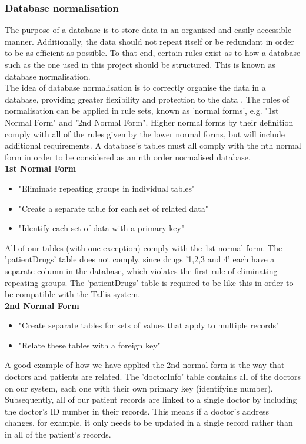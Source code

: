 \documentclass[11pt]{article}
\begin{document}
\subsubsection{Database normalisation}
The purpose of a database is to store data in an organised and easily accessible manner.  Additionally, the data should not repeat itself or be redundant in order to be as efficient as possible. To that end, certain rules exist as to how a database such as the one used in this project should be structured. This is known as database normalisation.
\\ \indent
The idea of database normalisation is to correctly organise the data in a database, providing greater flexibility and protection to the data \cite{microsoft:dbnorm}. The rules of normalisation can be applied in rule sets, known as 'normal forms', e.g. "1st Normal Form" and "2nd Normal Form". Higher normal forms by their definition comply with all of the rules given by the lower normal forms, but will include additional requirements. A database's tables must all comply with the nth normal form in order to be considered as an nth order normalised database.
\\
\textbf{1st Normal Form}
\begin{itemize}
\item{"Eliminate repeating groups in individual tables"}
\item{"Create a separate table for each set of related data"}
\item{"Identify each set of data with a primary key" \cite{microsoft:dbnorm}}
\end{itemize}
All of our tables (with one exception) comply with the 1st normal form. The 'patientDrugs' table does not comply, since drugs '1,2,3 and 4' each have a separate column in the database, which violates the first rule of eliminating repeating groups. The 'patientDrugs' table is required to be like this in order to be compatible with the Tallis system.
\\
\textbf{2nd Normal Form}
\begin{itemize}
\item{"Create separate tables for sets of values that apply to multiple records"}
\item{"Relate these tables with a foreign key" \cite{microsoft:dbnorm}}
\end{itemize}
A good example of how we have applied the 2nd normal form is the way that doctors and patients are related. The 'doctorInfo' table contains all of the doctors on our system, each one with their own primary key (identifying number). Subsequently, all of our patient records are linked to a single doctor by including the doctor's ID number in their records. This means if a doctor's address changes, for example, it only needs to be updated in a single record rather than in all of the patient's records. 
\end{document}

